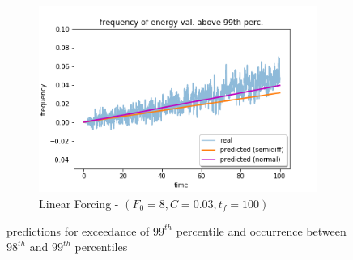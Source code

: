 \documentclass{article}
\begin{document}
\begin{figure}[!h]
\begin{subfigure}[b]{0.48\textwidth}
		\includegraphics[width=1\linewidth]{fig/pred_energy_exceed_099q_L_003_100.png}
		\caption{Linear Forcing - $(F_0=8, C=0.03, t_f=100)$}
		\label{fig:pred_energy_exceed_0.99q_L_003_100}
	\end{subfigure}
	\caption{predictions for exceedance of $99^{th}$ percentile and occurrence between $98^{th}$ and $99^{th}$ percentiles}
	\label{fig:pred_energy_exceed_0.99q}
\end{figure}



\newpage


\end{document}
